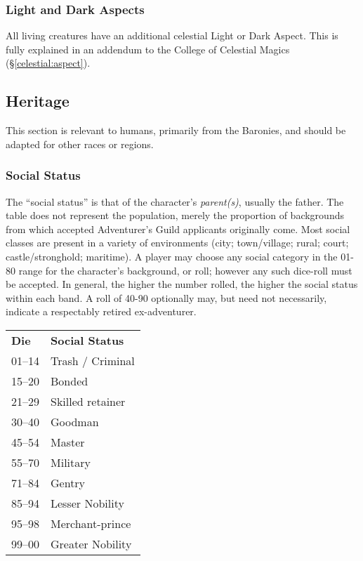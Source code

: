 \begin{multicols*}{3}
\subsubsection{Light and Dark Aspects}

All living creatures have an additional celestial Light or Dark
Aspect.  This is fully explained in an addendum to the College of
Celestial Magics (\S\ref{celestial:aspect}).

\subsection{Heritage}
\label{chargen:heritage}

This section is relevant to humans, primarily from the Baronies, and
should be adapted for other races or regions.

\subsubsection{Social Status}

The ``social status'' is that of the character's \emph{parent(s)},
usually the father.  The table does not represent the population,
merely the proportion of backgrounds from which accepted Adventurer's
Guild applicants originally come. Most social classes are present in a
variety of environments (city; town/village; rural; court;
castle/stronghold; maritime).  A player may choose any social category
in the 01-80 range for the character's background, or roll; however
any such dice-roll must be accepted.  In general, the higher the
number rolled, the higher the social status within each band.  A roll
of 40-90 optionally may, but need not necessarily, indicate a
respectably retired ex-adventurer.


\begin{tabularx}{\linewidth}{lX}
\textbf{Die} & \textbf{Social Status} \\
01--14	& Trash / Criminal \\
15--20	& Bonded \\
21--29	& Skilled retainer\\
30--40	& Goodman \\
45--54	& Master \\
55--70	& Military \\
71--84	& Gentry \\
85--94	& Lesser Nobility \\
95--98	& Merchant-prince \\
99--00	& Greater Nobility \\
\end{tabularx}


\end{multicols*}
